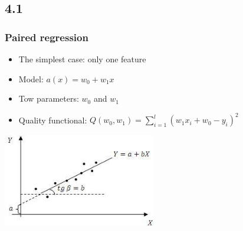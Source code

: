 \documentclass[default]{beamer}
\begin{document}
	\subsection{4.1}
	\begin{frame}
		\frametitle{Paired regression}
		
		\begin{itemize}
			\item The simplest case: only one feature
			\item Model: $a(x)=w_0+w_1x$
			\item Tow parameters: $w_0$ and $w_1$
			\item Quality functional: $Q(w_0,w_1)=\sum_{i=1}^l (w_1x_i+w_0-y_i)^2$
		\end{itemize}
		
		\centering
		\includegraphics[width=0.5\textwidth]{linear_18.jpg}
	\end{frame}
\end{document}
